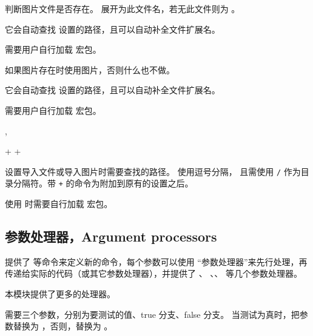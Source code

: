 \documentclass{cusdoc}
\begin{document}
\begin{function}{\IfGraphicsExists}
  \begin{syntax}
    \V\IfGraphicsExists {}  
  \end{syntax}
判断图片文件是否存在。 展开为此文件名，若无此文件则为 。

它会自动查找  设置的路径，且可以自动补全文件扩展名。

需要用户自行加载  宏包。
\end{function}

\begin{function}{\InputIfGraphicsExists}
  \begin{syntax}
    \V\InputIfGraphicsExists *  
  \end{syntax}
如果图片存在时使用图片，否则什么也不做。

它会自动查找  设置的路径，且可以自动补全文件扩展名。

需要用户自行加载  宏包。
\end{function}

\begin{function}{\setinputpath,\setgraphicspath}
  \begin{syntax}
    \V\setinputpath      {}
    \V\setinputpath    + 
    \V\setgraphicspath   {}
    \V\setgraphicspath + 
  \end{syntax}
设置导入文件或导入图片时需要查找的路径。 使用逗号分隔，
且需使用 \texttt/ 作为目录分隔符。带 \texttt+ 的命令为附加到原有的设置之后。

使用  时需要自行加载  宏包。
\end{function}

\subsection{参数处理器，Argument processors}

 提供了  等命令来定义新的命令，每个参数可以使用
“参数处理器”来先行处理，再传递给实际的代码（或其它参数处理器），并提供了 、
\cmd\SplitArgument、\cmd\SplitList、 等几个参数处理器。

本模块提供了更多的处理器。

\begin{function}{\ReplaceArgumentIf}
  \begin{syntax}
    \V\ReplaceArgumentIf {}  
  \end{syntax}
 需要三个参数，分别为要测试的值、true 分支、false 分支。
当测试为真时，把参数替换为 ，否则，替换为 。
\end{function}
\end{document}
